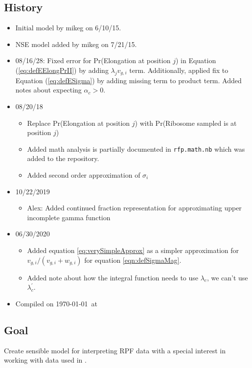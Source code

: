 \documentclass{article}
\newcommand{\elongWaitTime}{\ensuremath{w}\xspace}
\newcommand{\wgi}{\ensuremath{\elongWaitTime_{g,i}}\xspace}
\newcommand{\alphac}{\ensuremath{{\alpha_c}}\xspace}
\newcommand{\lambdac}{\ensuremath{{\lambda_c}}\xspace}
\newcommand{\lambdacprime}{\ensuremath{{\lambda_c^\prime}}\xspace}
\newcommand{\nseWaitTime}{\ensuremath{v}\xspace}
\newcommand{\vgi}{\ensuremath{\nseWaitTime_{g,i}}\xspace}
\begin{document}
\subsection*{History}
\begin{itemize}
\item Initial model  by mikeg on 6/10/15.
\item NSE model added by mikeg on 7/21/15.
\item 08/16/28: Fixed error for Pr(Elongation at position $j$) in Equation (\ref{eq:defEElongPrII}) by adding $\lambda_j v_{g,i}$ term.
  Additionally, applied fix to Equation (\ref{eq:defESigma}) by adding missing term to product term.
Added notes about expecting $\alphac > 0$.
\item 08/20/18
  \begin{itemize}
  \item Replace Pr(Elongation at position $j$) with Pr(Ribosome sampled is at position $j$)
  \item Added math analysis is partially documented in \texttt{rfp.math.nb} which was added to the repository.
  \item Added second order approximation of $\sigma_i$
  \end{itemize}
\item 10/22/2019
  \begin{itemize}
  \item Alex: Added continued fraction representation for approximating upper incomplete gamma function
  \end{itemize}
\item  06/30/2020
  \begin{itemize}
  \item Added equation \ref{eq:verySimpleApprox} as a simpler approximation for $\vgi/(\vgi+\wgi)$ for equation \ref{eqn:defSigmaMag}.
  \item Added note about how the integral function needs to use $\lambdac$, we can't use \lambdacprime.
  \end{itemize}
        
\item Compiled on \today \ at \ \currenttime
 \end{itemize}
\subsection*{Goal}
\label{goal}
Create sensible model for interpreting RPF data with a special interest in working with data used in \citet{PopEtAl2014}.
\end{document}

